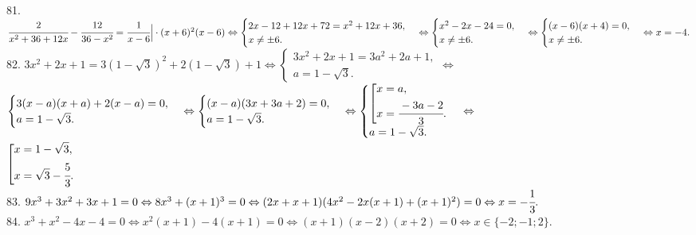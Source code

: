 81. $\cfrac{2}{x^2+36+12x}-\cfrac{12}{36-x^2}=\cfrac{1}{x-6}\Big|\cdot(x+6)^2(x-6)\Leftrightarrow
\begin{cases}2x-12+12x+72=x^2+12x+36,\\ x\neq\pm6.\end{cases}\Leftrightarrow
\begin{cases}x^2-2x-24=0,\\ x\neq\pm6.\end{cases}\Leftrightarrow
\begin{cases}(x-6)(x+4)=0,\\ x\neq\pm6.\end{cases}\Leftrightarrow x=-4.$\\
82. $3x^2+2x+1=3(1-\sqrt{3})^2+2(1-\sqrt{3})+1\Leftrightarrow\begin{cases}3x^2+2x+1=3a^2+2a+1,\\ a=1-\sqrt{3}.\end{cases}
\Leftrightarrow$\\$\begin{cases}3(x-a)(x+a)+2(x-a)=0,\\ a=1-\sqrt{3}.\end{cases}
\Leftrightarrow\begin{cases}(x-a)(3x+3a+2)=0,\\ a=1-\sqrt{3}.\end{cases}
\Leftrightarrow \begin{cases}\left[\begin{gathered}
     x=a,\hfill\\
     x=\cfrac{-3a-2}{3}.\hfill \end{gathered}\right.\\ a=1-\sqrt{3}.\end{cases}\Leftrightarrow$\\$
\left[\begin{gathered}
     x=1-\sqrt{3},\hfill\\
     x=\sqrt{3}-\cfrac{5}{3}.\hfill \end{gathered}\right.$\\
83. $9x^3+3x^2+3x+1=0\Leftrightarrow 8x^3+(x+1)^3=0 \Leftrightarrow (2x+x+1)(4x^2-2x(x+1)+(x+1)^2)=0\Leftrightarrow x=-\cfrac{1}{3}.$\\
84. $x^3+x^2-4x-4=0\Leftrightarrow x^2(x+1)-4(x+1)=0 \Leftrightarrow (x+1)(x-2)(x+2)=0 \Leftrightarrow x\in\{-2;-1;2\}.$\\

